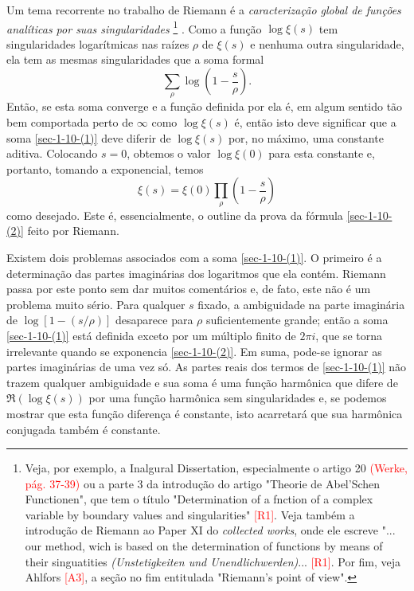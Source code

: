    
    Um tema recorrente no trabalho de Riemann é a \textit{caracterização global de funções analíticas por suas singularidades}
    \footnote{Veja, por exemplo, a Inalgural Dissertation, especialmente o artigo 20 \textcolor{red}{(Werke, pág. 37-39)} ou a parte 3 da introdução do artigo "Theorie de Abel'Schen Functionen", que tem o título "Determination of a fnction of a complex variable by boundary values and singularities" \textcolor{red}{[R1]}. Veja também a introdução de Riemann ao Paper XI do \textit{collected works}, onde ele escreve "... our method, wich is based on the determination of functions by means of their singuatities \textit{(Unstetigkeiten und Unendlichwerden)}... \textcolor{red}{[R1]}. Por fim, veja Ahlfors \textcolor{red}{[A3]}, a seção no fim entitulada "Riemann's point of view".}
    . Como a função $\log \xi(s)$ tem singularidades logarítmicas nas raízes $\rho$ de $\xi(s)$ e nenhuma outra singularidade, ela tem as mesmas singularidades que a soma formal
    \begin{equation}
        \label{sec-1-10-(1)}
        \sum_{\rho} \log \left( 1 - \frac{s}{\rho} \right).
    \end{equation}
    Então, se esta soma converge e a função definida por ela é, em algum sentido tão bem comportada perto de $\infty$ como $\log \xi(s)$ é, então isto deve significar que a soma \eqref{sec-1-10-(1)} deve diferir de $\log \xi(s)$ por, no máximo, uma constante aditiva. Colocando $s = 0$, obtemos o valor $\log \xi(0)$ para esta constante e, portanto, tomando a exponencial, temos
    \begin{equation}
        \label{sec-1-10-(2)}
        \xi(s) = \xi(0) \prod_{\rho} \left( 1 - \frac{s}{\rho} \right)
    \end{equation}
    como desejado. Este é, essencialmente, o outline 
    da prova da fórmula \eqref{sec-1-10-(2)} feito por Riemann.
    
    Existem dois problemas associados com a soma \eqref{sec-1-10-(1)}. 
    O primeiro é a determinação das partes imaginárias dos logaritmos que ela contém. 
    Riemann passa por este ponto sem dar muitos comentários e, de fato, 
    este não é um problema muito sério. Para qualquer $s$ fixado, 
    a ambiguidade na parte imaginária de $\log [1 - (s / \rho)]$ 
    desaparece para $\rho$ suficientemente grande; então a soma 
    \eqref{sec-1-10-(1)} está definida exceto por um múltiplo 
    finito de $2 \pi i$, que se torna irrelevante quando se 
    exponencia \eqref{sec-1-10-(2)}. Em suma, pode-se ignorar as 
    partes imaginárias de uma vez só. As partes reais dos termos 
    de \eqref{sec-1-10-(1)} não trazem qualquer ambiguidade e sua 
    soma é uma função harmônica que difere de $\Re(\log \xi(s))$ 
    por uma função harmônica sem singularidades e, se podemos 
    mostrar que esta função diferença é constante, isto 
    acarretará que sua harmônica conjugada também é constante. 
    
